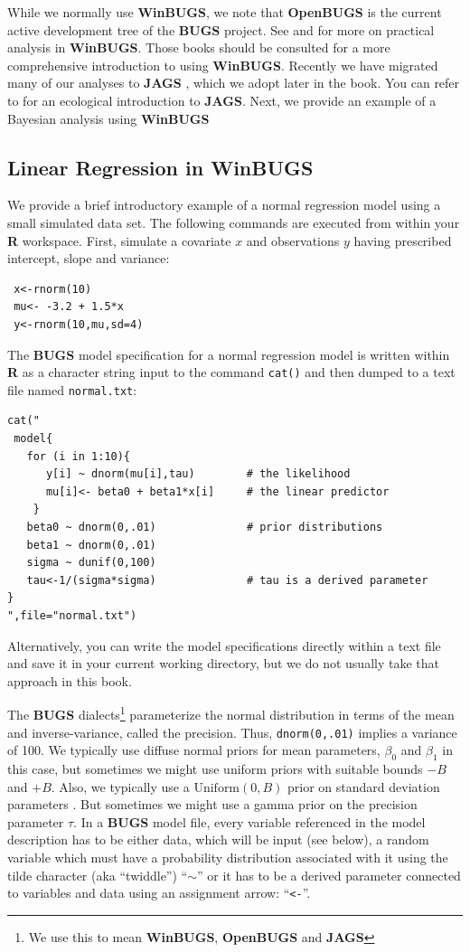 While we normally use {\bf WinBUGS}, we note that {\bf OpenBUGS} is
the current active development tree of the {\bf BUGS} project. See
\citet[][]{kery:2010} and \citet[][especially
App. 1]{kery_schaub:2011} for more on practical analysis in {\bf
  WinBUGS}.  Those books should be consulted for a more comprehensive
introduction to using {\bf WinBUGS}.  Recently we have migrated many
of our analyses to {\bf JAGS} \citep{plummer:2009}, which we adopt
later in the book. You can refer to \citet{hobbs:2011} for an
ecological introduction to {\bf JAGS}.  Next, we provide an example of
a Bayesian analysis using {\bf WinBUGS}

\subsection{Linear Regression in WinBUGS}
\label{GLMM.sect.linear}

We provide a brief introductory example of a normal regression model
using a small simulated data set. The following commands are executed
from within your {\bf R} workspace.
First, simulate a covariate $x$ and observations $y$ having
prescribed intercept, slope and variance:
\begin{verbatim}
 x<-rnorm(10)
 mu<- -3.2 + 1.5*x
 y<-rnorm(10,mu,sd=4)
\end{verbatim}
The {\bf BUGS} model specification for a normal regression model is
written within {\bf R} as a character string input to the command
\mbox{\tt cat()} and
then dumped to a text file named \mbox{\tt normal.txt}:
\begin{verbatim}
cat("
 model{ 
   for (i in 1:10){ 
      y[i] ~ dnorm(mu[i],tau)        # the likelihood
      mu[i]<- beta0 + beta1*x[i]     # the linear predictor
    }
   beta0 ~ dnorm(0,.01)              # prior distributions
   beta1 ~ dnorm(0,.01)
   sigma ~ dunif(0,100)
   tau<-1/(sigma*sigma)              # tau is a derived parameter
}
",file="normal.txt")
\end{verbatim}
Alternatively, you
can write the model specifications directly within a text file and
save it in your current working directory, but we do not usually take
that approach in this book.

The {\bf BUGS} dialects\footnote{We use this to mean {\bf WinBUGS},
  {\bf OpenBUGS} and {\bf JAGS}} parameterize the normal distribution
in terms of the mean and inverse-variance, called the precision. Thus,
\mbox{\tt dnorm(0,.01)} implies a variance of 100.  We typically use
diffuse normal priors for mean parameters, $\beta_0$ and $\beta_1$ in
this case, but sometimes we might use uniform priors with suitable
bounds $-B$ and $+B$.  Also, we typically use a $\text{Uniform}(0,B)$
prior on standard deviation parameters \citep{gelman:2006}.  But
sometimes we might use a gamma prior on the precision parameter
$\tau$.  In a {\bf BUGS} model file, every variable referenced in the
model description has to be either data, which will be input (see
below), a random variable which must have a probability distribution
associated with it using the tilde character (aka ``twiddle'')
``$\sim$'' or it has to be a derived parameter connected to variables
and data using an assignment arrow: ``\mbox{\tt <-}''.


